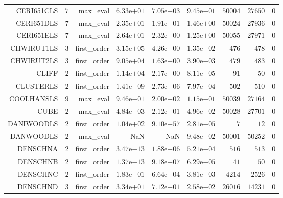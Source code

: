 \begin{longtable}{rrrrrrrrr}
CERI651CLS & \(     7\) & max\_eval & \( 6.33\)e\(+01\) & \( 7.05\)e\(+03\) & \( 9.45\)e\(-01\) & \( 50004\) & \( 27650\) & \(     0\) \\
CERI651DLS & \(     7\) & max\_eval & \( 2.35\)e\(+01\) & \( 1.91\)e\(+01\) & \( 1.46\)e\(+00\) & \( 50024\) & \( 27936\) & \(     0\) \\
CERI651ELS & \(     7\) & max\_eval & \( 2.64\)e\(+01\) & \( 2.32\)e\(+00\) & \( 1.25\)e\(+00\) & \( 50055\) & \( 27971\) & \(     0\) \\
CHWIRUT1LS & \(     3\) & first\_order & \( 3.15\)e\(+05\) & \( 4.26\)e\(+00\) & \( 1.35\)e\(-02\) & \(   476\) & \(   478\) & \(     0\) \\
CHWIRUT2LS & \(     3\) & first\_order & \( 9.05\)e\(+04\) & \( 1.63\)e\(+00\) & \( 3.90\)e\(-03\) & \(   479\) & \(   483\) & \(     0\) \\
CLIFF & \(     2\) & first\_order & \( 1.14\)e\(+04\) & \( 2.17\)e\(+00\) & \( 8.11\)e\(-05\) & \(    91\) & \(    50\) & \(     0\) \\
CLUSTERLS & \(     2\) & first\_order & \( 1.41\)e\(-09\) & \( 2.73\)e\(-06\) & \( 7.97\)e\(-04\) & \(   502\) & \(   510\) & \(     0\) \\
COOLHANSLS & \(     9\) & max\_eval & \( 9.46\)e\(-01\) & \( 2.00\)e\(+02\) & \( 1.15\)e\(-01\) & \( 50039\) & \( 27164\) & \(     0\) \\
CUBE & \(     2\) & max\_eval & \( 4.84\)e\(-03\) & \( 2.12\)e\(-01\) & \( 4.96\)e\(-02\) & \( 50028\) & \( 27701\) & \(     0\) \\
DANIWOODLS & \(     2\) & first\_order & \( 1.04\)e\(+02\) & \( 9.10\)e\(-57\) & \( 2.81\)e\(-05\) & \(     7\) & \(    12\) & \(     0\) \\
DANWOODLS & \(     2\) & max\_eval &       NaN &       NaN & \( 9.48\)e\(-02\) & \( 50001\) & \( 50252\) & \(     0\) \\
DENSCHNA & \(     2\) & first\_order & \( 3.47\)e\(-13\) & \( 1.88\)e\(-06\) & \( 5.21\)e\(-04\) & \(   516\) & \(   513\) & \(     0\) \\
DENSCHNB & \(     2\) & first\_order & \( 1.37\)e\(-13\) & \( 9.18\)e\(-07\) & \( 6.29\)e\(-05\) & \(    41\) & \(    50\) & \(     0\) \\
DENSCHNC & \(     2\) & first\_order & \( 1.83\)e\(-01\) & \( 6.64\)e\(-04\) & \( 3.81\)e\(-03\) & \(  4214\) & \(  2526\) & \(     0\) \\
DENSCHND & \(     3\) & first\_order & \( 3.34\)e\(+01\) & \( 7.12\)e\(+01\) & \( 2.58\)e\(-02\) & \( 26016\) & \( 14231\) & \(     0\) \\

\end{longtable}
